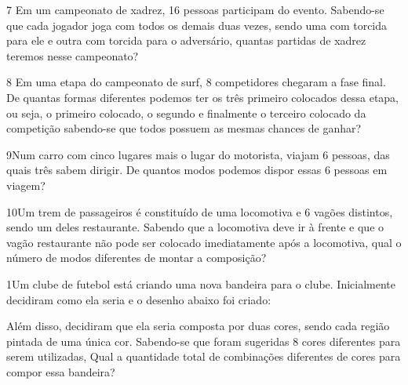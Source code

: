 \num{7} Em um campeonato de xadrez, 16 pessoas participam do evento.
Sabendo-se que cada jogador joga com todos os demais duas vezes, sendo
uma com torcida para ele e outra com torcida para o adversário, quantas
partidas de xadrez teremos nesse campeonato?



\num{8} Em uma etapa do campeonato de surf, 8 competidores chegaram a fase
final. De quantas formas diferentes podemos ter os três primeiro
colocados dessa etapa, ou seja, o primeiro colocado, o segundo e
finalmente o terceiro colocado da competição sabendo-se que todos
possuem as mesmas chances de ganhar?



\num{9}Num carro com cinco lugares mais o lugar do motorista, viajam 6
pessoas, das quais três sabem dirigir. De quantos modos podemos dispor
essas 6 pessoas em viagem?



\num{10}Um trem de passageiros é constituído de uma locomotiva e 6 vagões
distintos, sendo um deles restaurante. Sabendo que a locomotiva deve ir
à frente e que o vagão restaurante não pode ser colocado imediatamente
após a locomotiva, qual o número de modos diferentes de montar a
composição?




\num{1}Um clube de futebol está criando uma nova bandeira para o clube.
Inicialmente decidiram como ela seria e o desenho abaixo foi criado:


Além disso, decidiram que ela seria composta por duas cores, sendo cada
região pintada de uma única cor. Sabendo-se que foram sugeridas 8 cores
diferentes para serem utilizadas, Qual a quantidade total de combinações
diferentes de cores para compor essa bandeira?

